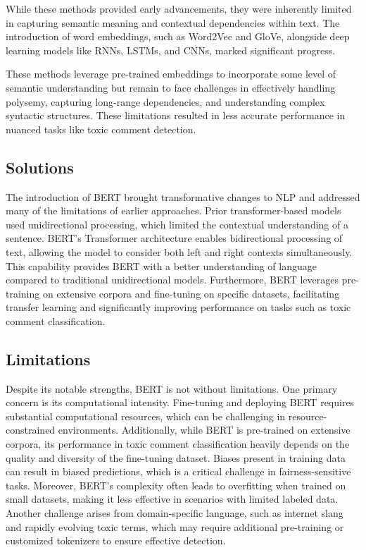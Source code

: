 While these methods provided early advancements, they were inherently limited in capturing semantic meaning and contextual dependencies within text. The introduction of word embeddings, such as Word2Vec and GloVe, alongside deep learning models like RNNs, LSTMs, and CNNs, marked significant progress. \cite{Zaheri2020, Sharma2018, Georgakopoulos2018, Anand2019}

These methods leverage pre-trained embeddings to incorporate some level of semantic understanding but remain to face challenges in effectively handling polysemy, capturing long-range dependencies, and understanding complex syntactic structures. These limitations resulted in less accurate performance in nuanced tasks like toxic comment detection. \cite{Devlin2019, Ezen2020, Tan2022}

\subsection{Solutions}
The introduction of BERT brought transformative changes to NLP and addressed many of the limitations of earlier approaches. Prior transformer-based models used unidirectional processing, which limited the contextual understanding of a sentence. BERT's Transformer architecture enables bidirectional processing of text, allowing the model to consider both left and right contexts simultaneously. This capability provides BERT with a better understanding of language compared to traditional unidirectional models. Furthermore, BERT leverages pre-training on extensive corpora and fine-tuning on specific datasets, facilitating transfer learning and significantly improving performance on tasks such as toxic comment classification. \cite{Devlin2019, radford2018improving, vaswani2017attention}

\subsection{Limitations}
Despite its notable strengths, BERT is not without limitations. One primary concern is its computational intensity. Fine-tuning and deploying BERT requires substantial computational resources, which can be challenging in resource-constrained environments. Additionally, while BERT is pre-trained on extensive corpora, its performance in toxic comment classification heavily depends on the quality and diversity of the fine-tuning dataset. Biases present in training data can result in biased predictions, which is a critical challenge in fairness-sensitive tasks. Moreover, BERT's complexity often leads to overfitting when trained on small datasets, making it less effective in scenarios with limited labeled data. Another challenge arises from domain-specific language, such as internet slang and rapidly evolving toxic terms, which may require additional pre-training or customized tokenizers to ensure effective detection. \cite{lee2021auber, vucetic2022efficient}
